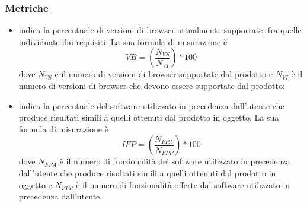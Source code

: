 \documentclass[PianoDiQualifica.tex]{subfiles}
\begin{document}
\subsubsection{Metriche}
\begin{itemize}
	\item {} indica la percentuale di versioni di browser attualmente supportate, fra quelle individuate dai requisiti. La sua formula di misurazione è \[VB=(\frac{N_{VS}}{N_{VI}})*100\] dove $ N_{VS} $ è il numero di versioni di browser supportate dal prodotto e $ N_{VI} $ è il numero di versioni di browser che devono essere supportate dal prodotto;
	\item {} indica la percentuale del software utilizzato in precedenza dall'utente che produce risultati simili a quelli ottenuti dal prodotto in oggetto. La sua formula di misurazione è \[IFP=(\frac{N_{FPA}}{N_{FPP}})*100\] dove $ N_{FPA} $ è il numero di funzionalità del software utilizzato in precedenza dall'utente che produce risultati simili a quelli ottenuti dal prodotto in oggetto e $ N_{FPP} $ è il numero di funzionalità offerte dal software utilizzato in precedenza dall'utente. 
\end{itemize}
\newpage
\end{document}
